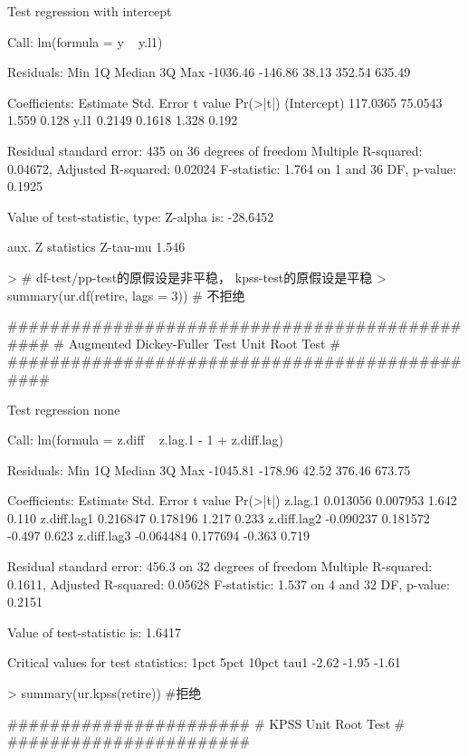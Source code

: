 \documentclass{article}
\begin{document}
\begin{Schunk}
\begin{Soutput}
Test regression with intercept 


Call:
lm(formula = y ~ y.l1)

Residuals:
     Min       1Q   Median       3Q      Max 
-1036.46  -146.86    38.13   352.54   635.49 

Coefficients:
            Estimate Std. Error t value Pr(>|t|)
(Intercept) 117.0365    75.0543   1.559    0.128
y.l1          0.2149     0.1618   1.328    0.192

Residual standard error: 435 on 36 degrees of freedom
Multiple R-squared:  0.04672,	Adjusted R-squared:  0.02024 
F-statistic: 1.764 on 1 and 36 DF,  p-value: 0.1925


Value of test-statistic, type: Z-alpha  is: -28.6452 

         aux. Z statistics
Z-tau-mu             1.546
\end{Soutput}
\begin{Sinput}
> # df-test/pp-test的原假设是非平稳， kpss-test的原假设是平稳
> summary(ur.df(retire, lags = 3)) # 不拒绝
\end{Sinput}
\begin{Soutput}
############################################### 
# Augmented Dickey-Fuller Test Unit Root Test # 
############################################### 

Test regression none 


Call:
lm(formula = z.diff ~ z.lag.1 - 1 + z.diff.lag)

Residuals:
     Min       1Q   Median       3Q      Max 
-1045.81  -178.96    42.52   376.46   673.75 

Coefficients:
             Estimate Std. Error t value Pr(>|t|)
z.lag.1      0.013056   0.007953   1.642    0.110
z.diff.lag1  0.216847   0.178196   1.217    0.233
z.diff.lag2 -0.090237   0.181572  -0.497    0.623
z.diff.lag3 -0.064484   0.177694  -0.363    0.719

Residual standard error: 456.3 on 32 degrees of freedom
Multiple R-squared:  0.1611,	Adjusted R-squared:  0.05628 
F-statistic: 1.537 on 4 and 32 DF,  p-value: 0.2151


Value of test-statistic is: 1.6417 

Critical values for test statistics: 
      1pct  5pct 10pct
tau1 -2.62 -1.95 -1.61
\end{Soutput}
\begin{Sinput}
> summary(ur.kpss(retire)) #拒绝
\end{Sinput}
\begin{Soutput}
####################### 
# KPSS Unit Root Test # 
####################### 


\end{Soutput}
\end{Schunk}
\end{document}
